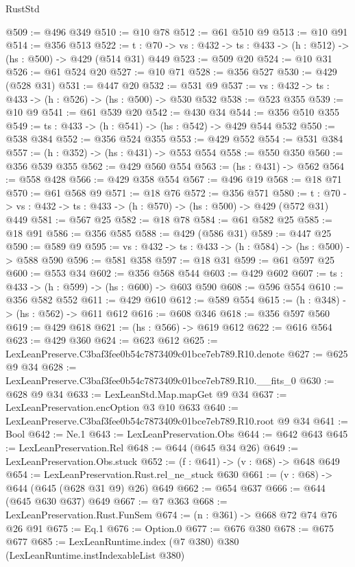 \begin{lexlean}{RustStd}
\begin{coremodule}
@509 := @496 @349
@510 := @10 @78
@512 := @61 @510 @9
@513 := @10 @91
@514 := @356 @513
@522 := {t : @70} -> {vs : @432} -> {ts : @433} -> (h : @512) -> (hs : @500) -> @429 (@514 @31) @449
@523 := @509 @20
@524 := @10 @31
@526 := @61 @524 @20
@527 := @10 @71
@528 := @356 @527
@530 := @429 (@528 @31)
@531 := @447 @20
@532 := @531 @9
@537 := {vs : @432} -> {ts : @433} -> (h : @526) -> (hs : @500) -> @530 @532
@538 := @523 @355
@539 := @10 @9
@541 := @61 @539 @20
@542 := @430 @34
@544 := @356 @510 @355
@549 := {ts : @433} -> (h : @541) -> (hs : @542) -> @429 @544 @532
@550 := @538 @384
@552 := @356 @524 @355
@553 := @429 @552
@554 := @531 @384
@557 := (h : @352) -> (hs : @431) -> @553 @554
@558 := @550 @350
@560 := @356 @539 @355
@562 := @429 @560 @554
@563 := (hs : @431) -> @562
@564 := @558 @428
@566 := @429 @358 @554
@567 := @496 @19
@568 := @18 @71
@570 := @61 @568 @9
@571 := @18 @76
@572 := @356 @571
@580 := {t : @70} -> {vs : @432} -> {ts : @433} -> (h : @570) -> (hs : @500) -> @429 (@572 @31) @449
@581 := @567 @25
@582 := @18 @78
@584 := @61 @582 @25
@585 := @18 @91
@586 := @356 @585
@588 := @429 (@586 @31)
@589 := @447 @25
@590 := @589 @9
@595 := {vs : @432} -> {ts : @433} -> (h : @584) -> (hs : @500) -> @588 @590
@596 := @581 @358
@597 := @18 @31
@599 := @61 @597 @25
@600 := @553 @34
@602 := @356 @568 @544
@603 := @429 @602
@607 := {ts : @433} -> (h : @599) -> (hs : @600) -> @603 @590
@608 := @596 @554
@610 := @356 @582 @552
@611 := @429 @610
@612 := @589 @554
@615 := (h : @348) -> (hs : @562) -> @611 @612
@616 := @608 @346
@618 := @356 @597 @560
@619 := @429 @618
@621 := (hs : @566) -> @619 @612
@622 := @616 @564
@623 := @429 @360
@624 := @623 @612
@625 := LexLeanPreserve.C3baf3fee0b54c7873409c01bce7eb789.R10.denote
@627 := @625 @9 @34
@628 := LexLeanPreserve.C3baf3fee0b54c7873409c01bce7eb789.R10.__fits_0
@630 := @628 @9 @34
@633 := LexLeanStd.Map.mapGet @9 @34
@637 := LexLeanPreservation.encOption @3 @10 @633
@640 := LexLeanPreserve.C3baf3fee0b54c7873409c01bce7eb789.R10.root @9 @34
@641 := Bool
@642 := Ne.{1}
@643 := LexLeanPreservation.Obs
@644 := @642 @643
@645 := LexLeanPreservation.Rel
@648 := @644 (@645 @34 @26)
@649 := LexLeanPreservation.Obs.stuck
@652 := (f : @641) -> (v : @68) -> @648 @649
@654 := LexLeanPreservation.Rust.rel_ne_stuck @630
@661 := (v : @68) -> @644 (@645 (@628 @31 @9) @26) @649
@662 := @654 @637
@666 := @644 (@645 @630 @637) @649
@667 := @7 @363
@668 := LexLeanPreservation.Rust.FunSem
@674 := (n : @361) -> @668 @72 @74 @76 @26 @91
@675 := Eq.{1}
@676 := Option.{0}
@677 := @676 @380
@678 := @675 @677
@685 := LexLeanRuntime.index (@7 @380) @380 (LexLeanRuntime.instIndexableList @380)

\end{coremodule}
\end{lexlean}
